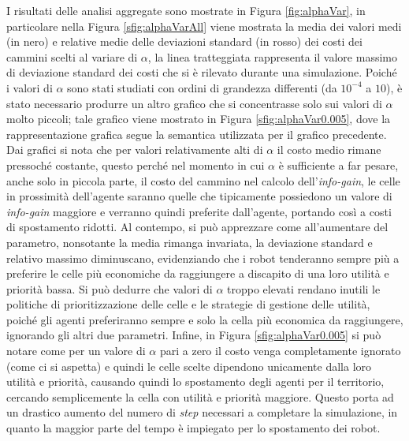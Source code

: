 I risultati delle analisi aggregate sono mostrate in Figura \ref{fig:alphaVar}, in particolare nella Figura \ref{sfig:alphaVarAll} viene mostrata la media dei valori medi (in nero) e relative medie delle deviazioni standard (in rosso) dei costi dei cammini scelti al variare di $\alpha$, la linea tratteggiata rappresenta il valore massimo di deviazione standard dei costi che si è rilevato durante una simulazione.
Poiché i valori di $\alpha$ sono stati studiati con ordini di grandezza differenti (da $10^{-4}$ a $10$), è stato necessario produrre un altro grafico che si concentrasse solo sui valori di $\alpha$ molto piccoli; tale grafico viene mostrato in Figura \ref{sfig:alphaVar0.005}, dove la rappresentazione grafica segue la semantica utilizzata per il grafico precedente.
Dai grafici si nota che per valori relativamente alti di $\alpha$ il costo medio rimane pressoché costante, questo perché nel momento in cui $\alpha$ è sufficiente a far pesare, anche solo in piccola parte, il costo del cammino nel calcolo dell'\textit{info-gain}, le celle in prossimità dell'agente saranno quelle che tipicamente possiedono un valore di \textit{info-gain} maggiore e verranno quindi preferite dall'agente, portando così a costi di spostamento ridotti.
Al contempo, si può apprezzare come all'aumentare del parametro, nonsotante la media rimanga invariata, la deviazione standard e relativo massimo diminuscano, evidenziando che i robot tenderanno sempre più a preferire le celle più economiche da raggiungere a discapito di una loro utilità e priorità bassa.
Si può dedurre che valori di $\alpha$ troppo elevati rendano inutili le politiche di prioritizzazione delle celle e le strategie di gestione delle utilità, poiché gli agenti preferiranno sempre e solo la cella più economica da raggiungere, ignorando gli altri due parametri.
Infine, in Figura \ref{sfig:alphaVar0.005} si può notare come per un valore di $\alpha$ pari a zero il costo venga completamente ignorato (come ci si aspetta) e quindi le celle scelte dipendono unicamente dalla loro utilità e priorità, causando quindi lo spostamento degli agenti per il territorio, cercando semplicemente la cella con utilità e priorità maggiore. Questo porta ad un drastico aumento del numero di \textit{step} necessari a completare la simulazione, in quanto la maggior parte del tempo è impiegato per lo spostamento dei robot.
